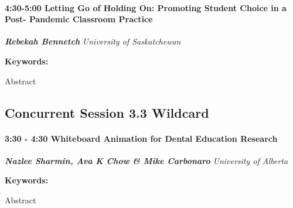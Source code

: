 \documentclass[
]{book}
\begin{document}
\begin{session}
\hypertarget{letting-go-of-holding-on-promoting-student-choice-in-a-post--pandemic-classroom-practice}{%
\paragraph*{\texorpdfstring{4:30-5:00 \textbar{} \textbf{Letting Go of
Holding On: Promoting Student Choice in a Post- Pandemic Classroom}
\textbar{}
Practice}{4:30-5:00 \textbar{} Letting Go of Holding On: Promoting Student Choice in a Post- Pandemic Classroom \textbar{} Practice}}\label{letting-go-of-holding-on-promoting-student-choice-in-a-post--pandemic-classroom-practice}}

\textbf{\emph{Rebekah Bennetch}} \textbar{} \emph{University of
Saskatchewan}

\textbf{Keywords:}

Abstract
\end{session}

\hypertarget{concurrent-session-3.3-wildcard}{%
\subsection*{Concurrent Session 3.3 \textbar{} Wildcard}\label{concurrent-session-3.3-wildcard}}

\begin{session}
\hypertarget{whiteboard-animation-for-dental-education-research}{%
\paragraph*{\texorpdfstring{3:30 - 4:30 \textbar{} \textbf{Whiteboard
Animation for Dental Education} \textbar{}
Research}{3:30 - 4:30 \textbar{} Whiteboard Animation for Dental Education \textbar{} Research}}\label{whiteboard-animation-for-dental-education-research}}

\textbf{\emph{Nazlee Sharmin, Ava K Chow \& Mike Carbonaro}} \textbar{}
\emph{University of Alberta}

\textbf{Keywords:}

Abstract
\end{session}
\end{document}
